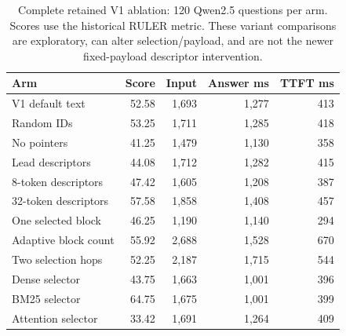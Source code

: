 \begin{table}[htbp]
\centering
\scriptsize
\setlength{\tabcolsep}{4pt}
\caption{Complete retained V1 ablation: 120 Qwen2.5 questions per arm. Scores use the historical RULER metric. These variant comparisons are exploratory, can alter selection/payload, and are not the newer fixed-payload descriptor intervention.}
\label{tab:legacy-ablation}
\begin{tabular}{lrrrr}
\toprule
Arm & Score & Input & Answer ms & TTFT ms \\
\midrule
V1 default text & 52.58 & 1,693 & 1,277 & 413 \\
Random IDs & 53.25 & 1,711 & 1,285 & 418 \\
No pointers & 41.25 & 1,479 & 1,130 & 358 \\
Lead descriptors & 44.08 & 1,712 & 1,282 & 415 \\
8-token descriptors & 47.42 & 1,605 & 1,208 & 387 \\
32-token descriptors & 57.58 & 1,858 & 1,408 & 457 \\
One selected block & 46.25 & 1,190 & 1,140 & 294 \\
Adaptive block count & 55.92 & 2,688 & 1,528 & 670 \\
Two selection hops & 52.25 & 2,187 & 1,715 & 544 \\
Dense selector & 43.75 & 1,663 & 1,001 & 396 \\
BM25 selector & 64.75 & 1,675 & 1,001 & 399 \\
Attention selector & 33.42 & 1,691 & 1,264 & 409 \\
\bottomrule
\end{tabular}
\end{table}
